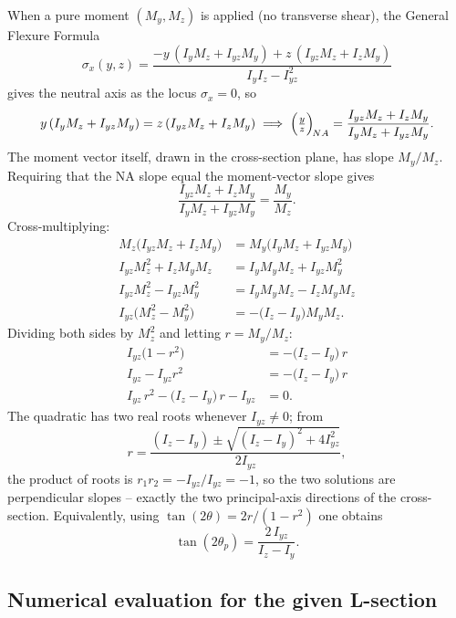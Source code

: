 \documentclass[11pt]{article}
\begin{document}
When a pure moment $(M_y, M_z)$ is applied (no transverse shear), the General Flexure Formula
\[
\sigma_x(y,z) = \frac{-y\,(I_y M_z + I_{yz} M_y) + z\,(I_{yz} M_z + I_z M_y)}{I_y I_z - I_{yz}^2}
\]
gives the neutral axis as the locus $\sigma_x = 0$, so
\[
y\,(I_y M_z + I_{yz} M_y) = z\,(I_{yz} M_z + I_z M_y)
\;\Longrightarrow\;
\Bigl(\tfrac{y}{z}\Bigr)_{\!NA} = \frac{I_{yz} M_z + I_z M_y}{I_y M_z + I_{yz} M_y}.
\]
The moment vector itself, drawn in the cross-section plane, has slope $M_y/M_z$. Requiring that the NA slope equal the moment-vector slope gives
\[
\frac{I_{yz} M_z + I_z M_y}{I_y M_z + I_{yz} M_y} = \frac{M_y}{M_z}.
\]
Cross-multiplying:
\begin{align*}
M_z\bigl(I_{yz} M_z + I_z M_y\bigr) &= M_y\bigl(I_y M_z + I_{yz} M_y\bigr)\\
I_{yz} M_z^2 + I_z M_y M_z &= I_y M_y M_z + I_{yz} M_y^2\\
I_{yz} M_z^2 - I_{yz} M_y^2 &= I_y M_y M_z - I_z M_y M_z\\
I_{yz}\bigl(M_z^2 - M_y^2\bigr) &= -\bigl(I_z - I_y\bigr) M_y M_z.
\end{align*}
Dividing both sides by $M_z^2$ and letting $r = M_y/M_z$:
\begin{align*}
I_{yz}\bigl(1 - r^2\bigr) &= -\bigl(I_z - I_y\bigr)\,r\\
I_{yz} - I_{yz} r^2 &= -\bigl(I_z - I_y\bigr)\,r\\
I_{yz}\,r^2 - \bigl(I_z - I_y\bigr)\,r - I_{yz} &= 0.
\end{align*}
The quadratic has two real roots whenever $I_{yz} \neq 0$; from
\[
r = \frac{(I_z - I_y) \pm \sqrt{(I_z - I_y)^2 + 4 I_{yz}^2}}{2 I_{yz}},
\]
the product of roots is $r_1 r_2 = -I_{yz}/I_{yz} = -1$, so the two solutions are perpendicular slopes -- exactly the two principal-axis directions of the cross-section. Equivalently, using $\tan(2\theta) = 2 r/(1 - r^2)$ one obtains
\[
\boxed{\;\tan(2\theta_p) = \frac{2\,I_{yz}}{I_z - I_y}.\;}
\]

\subsection*{Numerical evaluation for the given L-section}
\end{document}
